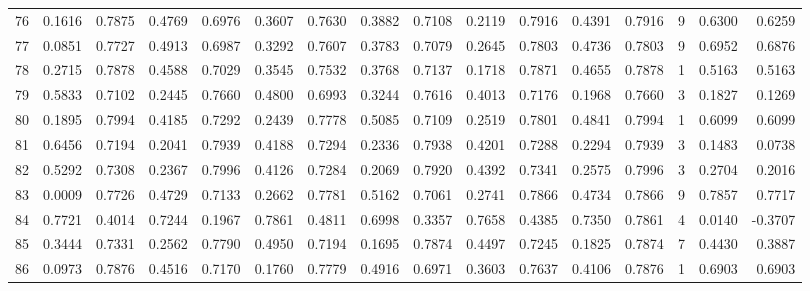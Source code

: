 \begin{tabular}{lrrrrrrrrrrrrrrr}
76  &      0.1616 &  0.7875 &  0.4769 &  0.6976 &  0.3607 &  0.7630 &  0.3882 &  0.7108 &  0.2119 &  0.7916 &   0.4391 &     0.7916 &      9 &                    0.6300 &                     0.6259 \\
77  &      0.0851 &  0.7727 &  0.4913 &  0.6987 &  0.3292 &  0.7607 &  0.3783 &  0.7079 &  0.2645 &  0.7803 &   0.4736 &     0.7803 &      9 &                    0.6952 &                     0.6876 \\
78  &      0.2715 &  0.7878 &  0.4588 &  0.7029 &  0.3545 &  0.7532 &  0.3768 &  0.7137 &  0.1718 &  0.7871 &   0.4655 &     0.7878 &      1 &                    0.5163 &                     0.5163 \\
79  &      0.5833 &  0.7102 &  0.2445 &  0.7660 &  0.4800 &  0.6993 &  0.3244 &  0.7616 &  0.4013 &  0.7176 &   0.1968 &     0.7660 &      3 &                    0.1827 &                     0.1269 \\
80  &      0.1895 &  0.7994 &  0.4185 &  0.7292 &  0.2439 &  0.7778 &  0.5085 &  0.7109 &  0.2519 &  0.7801 &   0.4841 &     0.7994 &      1 &                    0.6099 &                     0.6099 \\
81  &      0.6456 &  0.7194 &  0.2041 &  0.7939 &  0.4188 &  0.7294 &  0.2336 &  0.7938 &  0.4201 &  0.7288 &   0.2294 &     0.7939 &      3 &                    0.1483 &                     0.0738 \\
82  &      0.5292 &  0.7308 &  0.2367 &  0.7996 &  0.4126 &  0.7284 &  0.2069 &  0.7920 &  0.4392 &  0.7341 &   0.2575 &     0.7996 &      3 &                    0.2704 &                     0.2016 \\
83  &      0.0009 &  0.7726 &  0.4729 &  0.7133 &  0.2662 &  0.7781 &  0.5162 &  0.7061 &  0.2741 &  0.7866 &   0.4734 &     0.7866 &      9 &                    0.7857 &                     0.7717 \\
84  &      0.7721 &  0.4014 &  0.7244 &  0.1967 &  0.7861 &  0.4811 &  0.6998 &  0.3357 &  0.7658 &  0.4385 &   0.7350 &     0.7861 &      4 &                    0.0140 &                    -0.3707 \\
85  &      0.3444 &  0.7331 &  0.2562 &  0.7790 &  0.4950 &  0.7194 &  0.1695 &  0.7874 &  0.4497 &  0.7245 &   0.1825 &     0.7874 &      7 &                    0.4430 &                     0.3887 \\
86  &      0.0973 &  0.7876 &  0.4516 &  0.7170 &  0.1760 &  0.7779 &  0.4916 &  0.6971 &  0.3603 &  0.7637 &   0.4106 &     0.7876 &      1 &                    0.6903 &                     0.6903 \\

\end{tabular}
